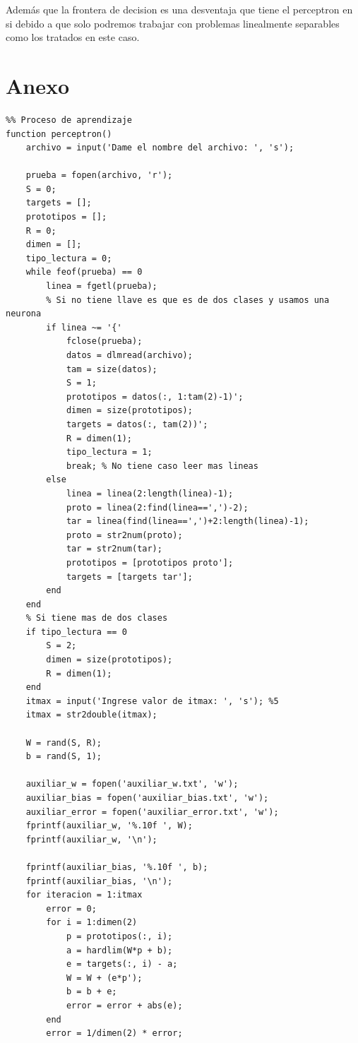 \documentclass[12pt, titlepage]{article}
\begin{document}
     Además que la frontera de decision es una desventaja que tiene el perceptron en si debido a que solo podremos trabajar con problemas linealmente separables como los tratados en este caso.
     \newpage
    
    
    \newpage
    \section{Anexo}
    \begin{lstlisting}
%% Proceso de aprendizaje
function perceptron()
    archivo = input('Dame el nombre del archivo: ', 's');
    
    prueba = fopen(archivo, 'r');
    S = 0;
    targets = [];
    prototipos = [];
    R = 0;
    dimen = [];
    tipo_lectura = 0;
    while feof(prueba) == 0
        linea = fgetl(prueba);
        % Si no tiene llave es que es de dos clases y usamos una neurona
        if linea ~= '{'
            fclose(prueba);
            datos = dlmread(archivo);
            tam = size(datos);
            S = 1;
            prototipos = datos(:, 1:tam(2)-1)';
            dimen = size(prototipos);
            targets = datos(:, tam(2))';
            R = dimen(1);
            tipo_lectura = 1;
            break; % No tiene caso leer mas lineas
        else
            linea = linea(2:length(linea)-1);
            proto = linea(2:find(linea==',')-2);
            tar = linea(find(linea==',')+2:length(linea)-1);
            proto = str2num(proto);
            tar = str2num(tar);
            prototipos = [prototipos proto'];
            targets = [targets tar'];
        end
    end
    % Si tiene mas de dos clases
    if tipo_lectura == 0
        S = 2;
        dimen = size(prototipos);
        R = dimen(1);
    end   
    itmax = input('Ingrese valor de itmax: ', 's'); %5
    itmax = str2double(itmax);
    
    W = rand(S, R);
    b = rand(S, 1);
    
    auxiliar_w = fopen('auxiliar_w.txt', 'w');
    auxiliar_bias = fopen('auxiliar_bias.txt', 'w');
    auxiliar_error = fopen('auxiliar_error.txt', 'w');
    fprintf(auxiliar_w, '%.10f ', W);
    fprintf(auxiliar_w, '\n');
    
    fprintf(auxiliar_bias, '%.10f ', b);
    fprintf(auxiliar_bias, '\n');
    for iteracion = 1:itmax
        error = 0;
        for i = 1:dimen(2)
            p = prototipos(:, i);
            a = hardlim(W*p + b);
            e = targets(:, i) - a;
            W = W + (e*p');
            b = b + e;
            error = error + abs(e);
        end
        error = 1/dimen(2) * error;
    

\end{lstlisting}
\end{document}
